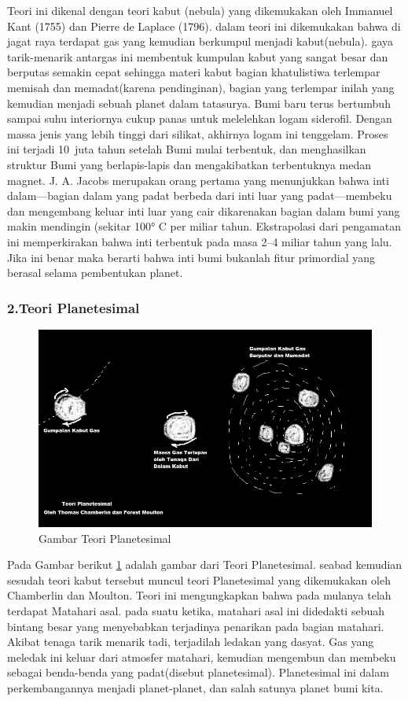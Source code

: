 Teori ini dikenal dengan teori kabut (nebula) yang dikemukakan oleh Immanuel Kant (1755) dan Pierre de Laplace (1796). dalam teori ini dikemukakan bahwa di jagat raya terdapat gas yang kemudian berkumpul menjadi kabut(nebula). gaya tarik-menarik antargas ini membentuk kumpulan kabut yang sangat besar dan berputas semakin cepat sehingga materi kabut bagian khatulistiwa terlempar memisah dan memadat(karena pendinginan), bagian yang terlempar inilah yang kemudian menjadi sebuah planet dalam tatasurya. Bumi baru terus bertumbuh sampai suhu interiornya cukup panas untuk melelehkan logam siderofil. Dengan massa jenis yang lebih tinggi dari silikat, akhirnya logam ini tenggelam. Proses ini terjadi 10 juta tahun setelah Bumi mulai terbentuk, dan menghasilkan struktur Bumi yang berlapis-lapis dan mengakibatkan terbentuknya medan magnet. J. A. Jacobs merupakan orang pertama yang menunjukkan bahwa inti dalam—bagian dalam yang padat berbeda dari inti luar yang padat—membeku dan mengembang keluar inti luar yang cair dikarenakan bagian dalam bumi yang makin mendingin (sekitar 100° C per miliar tahun. Ekstrapolasi dari pengamatan ini memperkirakan bahwa inti terbentuk pada masa 2–4 miliar tahun yang lalu. Jika ini benar maka berarti bahwa inti bumi bukanlah fitur primordial yang berasal selama pembentukan planet.

\subsubsection{2.Teori Planetesimal}
\begin{figure} [ht]
	\centerline{\includegraphics[width=1\textwidth]{figures/teoriplanetesimal.JPG}}
	\caption{Gambar Teori Planetesimal}
	\label{teoriplanetesimal}
	\end{figure}
	Pada Gambar berikut \ref{teoriplanetesimal} adalah gambar dari Teori Planetesimal.
seabad kemudian sesudah teori kabut tersebut muncul teori Planetesimal yang dikemukakan oleh Chamberlin dan Moulton. Teori ini mengungkapkan bahwa pada mulanya telah terdapat Matahari asal. pada suatu ketika, matahari asal ini didedakti sebuah bintang besar yang menyebabkan terjadinya penarikan pada bagian matahari. Akibat tenaga tarik menarik tadi, terjadilah ledakan yang dasyat. Gas yang meledak ini keluar dari atmosfer matahari, kemudian mengembun dan membeku sebagai benda-benda yang padat(disebut planetesimal). Planetesimal ini dalam perkembangannya menjadi planet-planet, dan salah satunya planet bumi kita.

